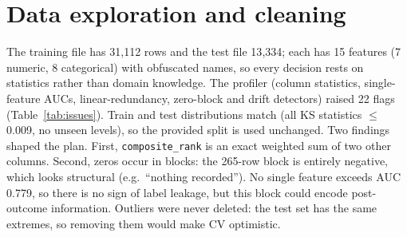 \documentclass[10pt]{article}
\begin{document}
\section{Data exploration and cleaning}
The training file has 31{,}112 rows and the test file 13{,}334; each has 15 features (7 numeric, 8 categorical) with obfuscated names, so every decision rests on statistics rather than domain knowledge. The profiler (column statistics, single-feature AUCs, linear-redundancy, zero-block and drift detectors) raised 22 flags (Table~\ref{tab:issues}). Train and test distributions match (all KS statistics $\le$ 0.009, no unseen levels), so the provided split is used unchanged. Two findings shaped the plan. First, \texttt{composite\_rank} is an exact weighted sum of two other columns. Second, zeros occur in blocks: the 265-row block is entirely negative, which looks structural (e.g.\ ``nothing recorded''). No single feature exceeds AUC 0.779, so there is no sign of label leakage, but this block could encode post-outcome information. Outliers were never deleted: the test set has the same extremes, so removing them would make CV optimistic.
\end{document}
